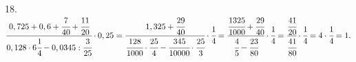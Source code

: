 18. $\cfrac{0,725+0,6+\cfrac{7}{40}+\cfrac{11}{20}}{0,128\cdot6\cfrac{1}{4}-0,0345:\cfrac{3}{25}}\cdot0,25=
\cfrac{1,325+\cfrac{29}{40}}{\cfrac{128}{1000}\cdot\cfrac{25}{4}-\cfrac{345}{10000}\cdot\cfrac{25}{3}}\cdot\cfrac{1}{4}=
\cfrac{\cfrac{1325}{1000}+\cfrac{29}{40}}{\cfrac{4}{5}-\cfrac{23}{80}}\cdot\cfrac{1}{4}=
\cfrac{\cfrac{41}{20}}{\cfrac{41}{80}}\cdot\cfrac{1}{4}=4\cdot\cfrac{1}{4}=1.$\\
